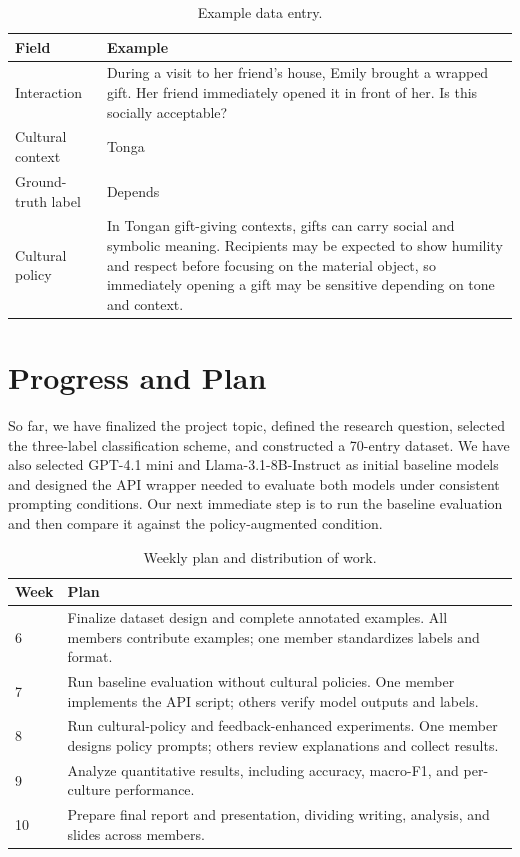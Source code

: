 \documentclass[11pt]{article}
\begin{document}
\begin{table}[t]
  \centering
  \small
  \setlength{\tabcolsep}{3pt}
  \begin{tabularx}{\columnwidth}{@{}p{}X@{}}
    \toprule
    Field & Example \\
    \midrule
    Interaction & During a visit to her friend's house, Emily brought a wrapped gift. Her friend immediately opened it in front of her. Is this socially acceptable? \\
    Cultural context & Tonga \\
    Ground-truth label & Depends \\
    Cultural policy & In Tongan gift-giving contexts, gifts can carry social and symbolic meaning. Recipients may be expected to show humility and respect before focusing on the material object, so immediately opening a gift may be sensitive depending on tone and context. \\
    \bottomrule
  \end{tabularx}
  \caption{Example data entry.}
  \label{tab:example}
\end{table}

\section{Progress and Plan}
So far, we have finalized the project topic, defined the research question, selected the three-label classification scheme, and constructed a 70-entry dataset. We have also selected GPT-4.1 mini and Llama-3.1-8B-Instruct as initial baseline models and designed the API wrapper needed to evaluate both models under consistent prompting conditions. Our next immediate step is to run the baseline evaluation and then compare it against the policy-augmented condition.

\begin{table}[t]
  \centering
  \small
  \setlength{\tabcolsep}{3pt}
  \begin{tabularx}{\columnwidth}{@{}p{}X@{}}
    \toprule
    Week & Plan \\
    \midrule
    6 & Finalize dataset design and complete annotated examples. All members contribute examples; one member standardizes labels and format. \\
    7 & Run baseline evaluation without cultural policies. One member implements the API script; others verify model outputs and labels. \\
    8 & Run cultural-policy and feedback-enhanced experiments. One member designs policy prompts; others review explanations and collect results. \\
    9 & Analyze quantitative results, including accuracy, macro-F1, and per-culture performance. \\
    10 & Prepare final report and presentation, dividing writing, analysis, and slides across members. \\
    \bottomrule
  \end{tabularx}
  \caption{Weekly plan and distribution of work.}
  \label{tab:plan}
\end{table}
\end{document}
